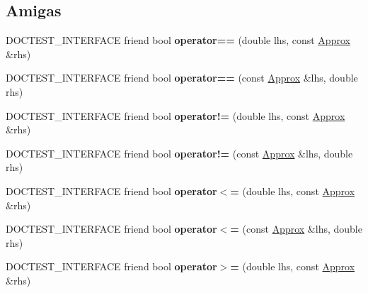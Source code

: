 \subsection*{Amigas}
\begin{DoxyCompactItemize}
\item 
\mbox{\label{classdoctest_1_1Approx_a2b6b56551f113fd12f4a52b4d3e5fd7e}} 
D\+O\+C\+T\+E\+S\+T\+\_\+\+I\+N\+T\+E\+R\+F\+A\+CE friend bool {\bfseries operator==} (double lhs, const \hyperlink{classdoctest_1_1Approx}{Approx} \&rhs)
\item 
\mbox{\label{classdoctest_1_1Approx_a1b99d0c4c3924a253474e68ae30e1175}} 
D\+O\+C\+T\+E\+S\+T\+\_\+\+I\+N\+T\+E\+R\+F\+A\+CE friend bool {\bfseries operator==} (const \hyperlink{classdoctest_1_1Approx}{Approx} \&lhs, double rhs)
\item 
\mbox{\label{classdoctest_1_1Approx_a44d4bbc575291095c884848887538233}} 
D\+O\+C\+T\+E\+S\+T\+\_\+\+I\+N\+T\+E\+R\+F\+A\+CE friend bool {\bfseries operator!=} (double lhs, const \hyperlink{classdoctest_1_1Approx}{Approx} \&rhs)
\item 
\mbox{\label{classdoctest_1_1Approx_ae86972ba14656f422afdcc60cd2cdb08}} 
D\+O\+C\+T\+E\+S\+T\+\_\+\+I\+N\+T\+E\+R\+F\+A\+CE friend bool {\bfseries operator!=} (const \hyperlink{classdoctest_1_1Approx}{Approx} \&lhs, double rhs)
\item 
\mbox{\label{classdoctest_1_1Approx_af2fef67cf4508a446eeaf38dafae661f}} 
D\+O\+C\+T\+E\+S\+T\+\_\+\+I\+N\+T\+E\+R\+F\+A\+CE friend bool {\bfseries operator$<$=} (double lhs, const \hyperlink{classdoctest_1_1Approx}{Approx} \&rhs)
\item 
\mbox{\label{classdoctest_1_1Approx_a7f32e572caa5ee152b8ade301fcfd838}} 
D\+O\+C\+T\+E\+S\+T\+\_\+\+I\+N\+T\+E\+R\+F\+A\+CE friend bool {\bfseries operator$<$=} (const \hyperlink{classdoctest_1_1Approx}{Approx} \&lhs, double rhs)
\item 
\mbox{\label{classdoctest_1_1Approx_acf882dbff26c57cd8404da3edd46f45e}} 
D\+O\+C\+T\+E\+S\+T\+\_\+\+I\+N\+T\+E\+R\+F\+A\+CE friend bool {\bfseries operator$>$=} (double lhs, const \hyperlink{classdoctest_1_1Approx}{Approx} \&rhs)

\end{DoxyCompactItemize}
